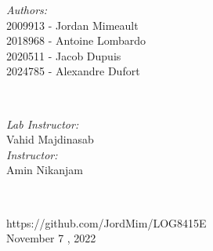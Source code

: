 \begin{titlepage}
\begin{minipage}{0.4\textwidth}
\begin{flushleft} \large
\emph{Authors:}\\
2009913 - Jordan Mimeault\\
2018968 - Antoine Lombardo\\
2020511 - Jacob Dupuis\\
2024785 - Alexandre Dufort\\[1.2em]
\end{flushleft}
\end{minipage}
~
\begin{minipage}{0.4\textwidth}
\begin{flushright} \large
\emph{Lab Instructor:} \\
Vahid Majdinasab  \\[1.2em] %
\emph{Instructor:} \\
Amin Nikanjam %
\end{flushright}
\end{minipage}\\[2cm]
\makeatother


{\large https://github.com/JordMim/LOG8415E}\\[2cm]


{\large November 7 , 2022}\\[2cm] %

\vfill %

\end{titlepage}